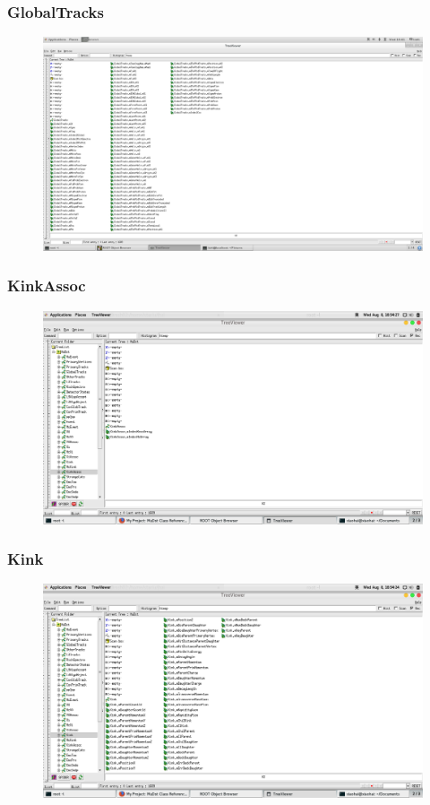 \documentclass[10pt]{beamer}
\begin{document}
\label{GlobalTracks}
\begin{frame}
  \frametitle{GlobalTracks}
  \begin{figure}[hbtp]
    \centering
    \includegraphics[width=\textwidth]{GlobalTracks.png}
  \end{figure}
\end{frame}
\label{KinkAssoc}
\begin{frame}
  \frametitle{KinkAssoc}
  \begin{figure}[hbtp]
    \centering
    \includegraphics[width=\textwidth]{KinkAssoc.png}
  \end{figure}
\end{frame}
\label{Kink}
\begin{frame}
  \frametitle{Kink}
  \begin{figure}[hbtp]
    \centering
    \includegraphics[width=\textwidth]{Kink.png}
  \end{figure}
\end{frame}
\end{document}
